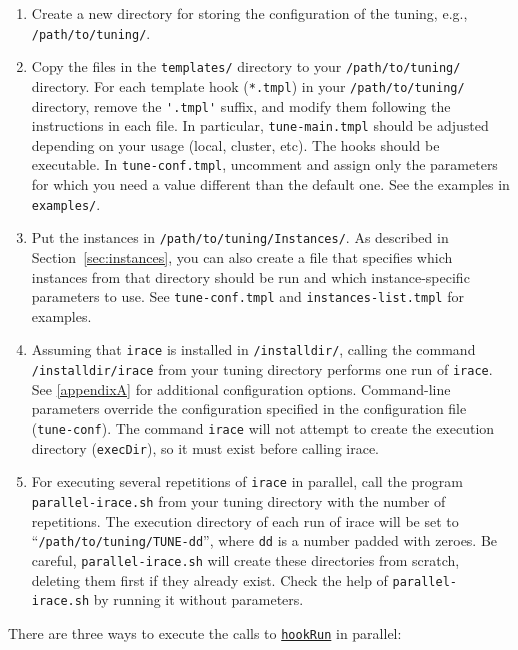 \documentclass[a4paper]{article}
\newcommand{\irace}{\texttt{irace}\xspace}
\newcommand{\eg}{e.g.}%
\newcommand{\parameter}[1]{\hyperlink{opt:#1}{\texttt{#1}}}
\begin{document}
\begin{enumerate}
\item Create a new directory for storing the configuration of the
  tuning, \eg{}, \texttt{/path/to/tuning/}.

\item Copy the files in the \texttt{templates/} directory to your
  \texttt{/path/to/tuning/} directory.  For each template hook
  (\verb|*.tmpl|) in your \texttt{/path/to/tuning/} directory, remove the
  \verb|'.tmpl'| suffix, and modify them following the instructions in each
  file. In particular, \texttt{tune-main.tmpl} should be adjusted depending on
  your usage (local, cluster, etc).  The hooks should be
  executable. In \verb|tune-conf.tmpl|, uncomment and assign only the
  parameters for which you need a value different than the default
  one. See the examples in \texttt{examples/}.


\item Put the instances in \texttt{/path/to/tuning/Instances/}. As
  described in Section~\ref{sec:instances}, you can
  also create a file that specifies which instances from that directory
  should be run and which instance-specific parameters to use. See
  \texttt{tune-conf.tmpl} and \texttt{instances-list.tmpl} for
  examples.

\item Assuming that \irace is installed in \texttt{/installdir/},
  calling the command \texttt{/installdir/irace} from your tuning
  directory performs one run of \irace. See \autoref{appendixA} for
  additional configuration options. Command-line parameters override
  the configuration specified in the configuration file
  (\texttt{tune-conf}). The command \irace will not attempt to create
  the execution directory (\texttt{execDir}), so it must exist before
  calling irace.

\item For executing several repetitions of \irace in parallel, call
  the program \texttt{parallel-irace.sh} from your tuning directory
  with the number of repetitions. The execution directory of each run
  of irace will be set to ``\texttt{/path/to/tuning/TUNE-dd}'', where
  \texttt{dd} is a number padded with zeroes. Be careful,
  \texttt{parallel-irace.sh} will create these directories from scratch,
  deleting them first if they already exist. Check the help of
  \texttt{parallel-irace.sh} by running it without parameters.
\end{enumerate}


There are three ways to execute the calls to \parameter{hookRun} in parallel:
\end{document}
